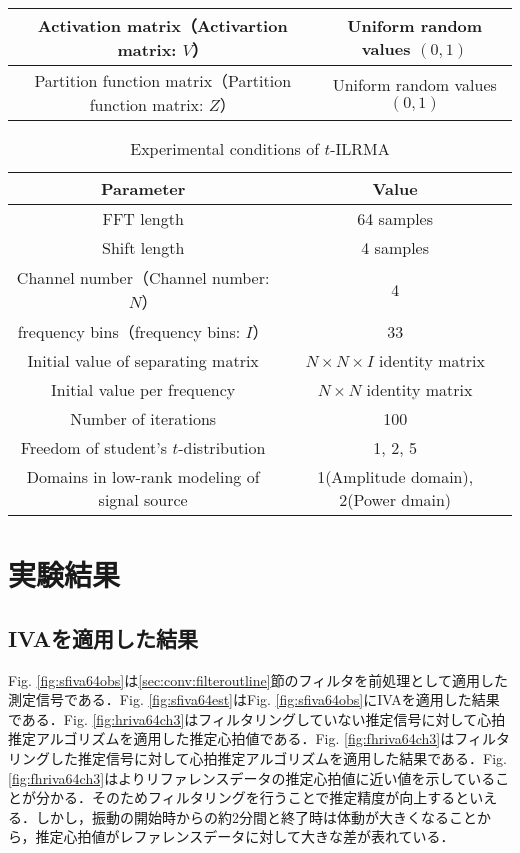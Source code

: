 {\begin{table}[t]
\begin{tabular}{cc}
    Activation matrix（Activartion matrix: $V$） & Uniform random values $(0,1)$ \\ \hline 
    Partition function matrix（Partition function matrix: $Z$） & Uniform random values $(0,1)$ \\ \hline \hline
  \end{tabular}
  \label{tab:variableilrma}
\end{table}
\begin{table}[t] 
  \caption{Experimental conditions of $t$-ILRMA}
  \centering
  \begin{tabular}{cc}\hline
    Parameter & Value \\ \hline \hline
    FFT length & 64 samples  \\ \hline
    Shift length & 4 samples \\ \hline
    Channel number（Channel number: $N$） & 4 \\ \hline
    frequency bins（frequency bins: $I$） & 33 \\ \hline
    Initial value of separating matrix & $N \times N \times I$ identity matrix  \\ \hline
    Initial value per frequency & $N \times N$ identity matrix  \\ \hline
    Number of iterations & 100\\ \hline
    Freedom of student's $t$-distribution & 1, 2, 5\\ \hline
    Domains in low-rank modeling of signal source & 1(Amplitude domain), 2(Power dmain)\\ \hline
  \end{tabular}
  \label{tab:tilrma}
\end{table}

\section{実験結果}
\label{sec:conv:expresult5}

\subsection{IVAを適用した結果}
\label{sec:conv:resultiva}
Fig. \ref{fig:sfiva64obs}は\ref{sec:conv:filteroutline}節のフィルタを前処理として適用した測定信号である．Fig. \ref{fig:sfiva64est}はFig. \ref{fig:sfiva64obs}にIVAを適用した結果である．Fig. \ref{fig:hriva64ch3}はフィルタリングしていない推定信号に対して心拍推定アルゴリズムを適用した推定心拍値である．Fig. \ref{fig:fhriva64ch3}はフィルタリングした推定信号に対して心拍推定アルゴリズムを適用した結果である．Fig. \ref{fig:fhriva64ch3}はよりリファレンスデータの推定心拍値に近い値を示していることが分かる．そのためフィルタリングを行うことで推定精度が向上するといえる．しかし，振動の開始時からの約2分間と終了時は体動が大きくなることから，推定心拍値がレファレンスデータに対して大きな差が表れている．

}
